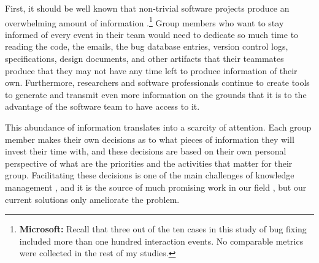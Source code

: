 First, it should be well known that non-trivial software projects produce an overwhelming amount of information \cite{Yatani2009}.\footnote{\textbf{Microsoft:} Recall that three out of the ten cases in this study of bug fixing included more than one hundred interaction events. No comparable metrics were collected in the rest of my studies.} Group members who want to stay informed of every event in their team would need to dedicate so much time to reading the code, the emails, the bug database entries, version control logs, specifications, design documents, and other artifacts that their teammates produce that they may not have any time left to produce information of their own. Furthermore, researchers and software professionals continue to create tools to generate and transmit even more information on the grounds that it is to the advantage of the software team to have access to it.

This abundance of information translates into a scarcity of attention. Each group member makes their own decisions as to what pieces of information they will invest their time with, and these decisions are based on their own personal perspective of what are the priorities and the activities that matter for their group. Facilitating these decisions is one of the main challenges of knowledge management \cite{Alavi2001}, and it is the source of much promising work in our field \cite{Treude2009}, but our current solutions only ameliorate the problem.

